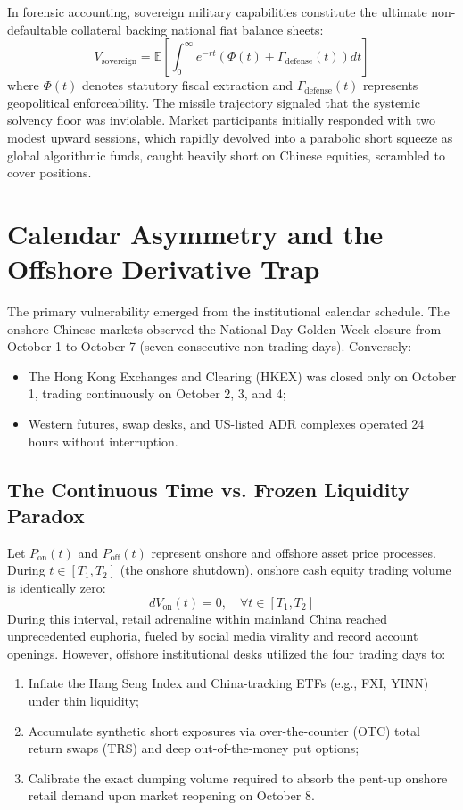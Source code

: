 \documentclass[11pt,a4paper]{article}
\begin{document}
In forensic accounting, sovereign military capabilities constitute the ultimate non-defaultable collateral backing national fiat balance sheets:
\begin{equation}
    V_{\text{sovereign}} = \mathbb{E} \left[ \int_{0}^{\infty} e^{-rt} \left( \Phi(t) + \Gamma_{\text{defense}}(t) \right) dt \right]
\end{equation}
where $\Phi(t)$ denotes statutory fiscal extraction and $\Gamma_{\text{defense}}(t)$ represents geopolitical enforceability. The missile trajectory signaled that the systemic solvency floor was inviolable. Market participants initially responded with two modest upward sessions, which rapidly devolved into a parabolic short squeeze as global algorithmic funds, caught heavily short on Chinese equities, scrambled to cover positions.

\section{Calendar Asymmetry and the Offshore Derivative Trap}

The primary vulnerability emerged from the institutional calendar schedule. The onshore Chinese markets observed the National Day Golden Week closure from October 1 to October 7 (seven consecutive non-trading days). Conversely:
\begin{itemize}
    \item The Hong Kong Exchanges and Clearing (HKEX) was closed only on October 1, trading continuously on October 2, 3, and 4;
    \item Western futures, swap desks, and US-listed ADR complexes operated 24 hours without interruption.
\end{itemize}

\subsection{The Continuous Time vs. Frozen Liquidity Paradox}

Let $P_{\text{on}}(t)$ and $P_{\text{off}}(t)$ represent onshore and offshore asset price processes. During $t \in [T_1, T_2]$ (the onshore shutdown), onshore cash equity trading volume is identically zero:
\begin{equation}
    dV_{\text{on}}(t) = 0, \quad \forall t \in [T_1, T_2]
\end{equation}
During this interval, retail adrenaline within mainland China reached unprecedented euphoria, fueled by social media virality and record account openings. However, offshore institutional desks utilized the four trading days to:
\begin{enumerate}
    \item Inflate the Hang Seng Index and China-tracking ETFs (e.g., FXI, YINN) under thin liquidity;
    \item Accumulate synthetic short exposures via over-the-counter (OTC) total return swaps (TRS) and deep out-of-the-money put options;
    \item Calibrate the exact dumping volume required to absorb the pent-up onshore retail demand upon market reopening on October 8.
\end{enumerate}
\end{document}
